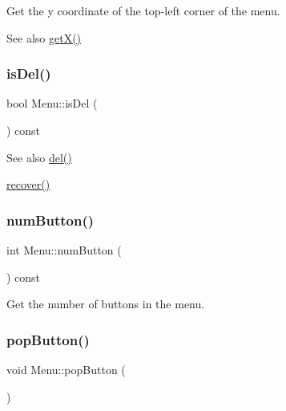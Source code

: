 Get the y coordinate of the top-\/left corner of the menu. 

\begin{DoxySeeAlso}{See also}
\mbox{\hyperlink{class_menu_a75345bb25315b3cbcc98ad276e043f4d}{get\+X()}} 
\end{DoxySeeAlso}
\mbox{\label{class_menu_a8dd5bf7c984e940e18688fc2d21a7697}} 
\subsubsection{\texorpdfstring{is\+Del()}{isDel()}}
{\footnotesize\ttfamily bool Menu\+::is\+Del (\begin{DoxyParamCaption}{ }\end{DoxyParamCaption}) const\hspace{0.3cm}{\ttfamily [inline]}}

\begin{DoxySeeAlso}{See also}
\mbox{\hyperlink{class_menu_a51548806948f9617dc6b66080eec0ca5}{del()}} 

\mbox{\hyperlink{class_menu_a75a1e9e303a0d8398b6cfc498a92ed48}{recover()}} 
\end{DoxySeeAlso}
\mbox{\label{class_menu_aa0878bc89af6cb4b96132966af62b1e0}} 
\subsubsection{\texorpdfstring{num\+Button()}{numButton()}}
{\footnotesize\ttfamily int Menu\+::num\+Button (\begin{DoxyParamCaption}{ }\end{DoxyParamCaption}) const\hspace{0.3cm}{\ttfamily [inline]}}



Get the number of buttons in the menu. 

\mbox{\label{class_menu_a674cd38ddc325b22ec9364e7f83f0b6d}} 
\subsubsection{\texorpdfstring{pop\+Button()}{popButton()}}
{\footnotesize\ttfamily void Menu\+::pop\+Button (\begin{DoxyParamCaption}{ }\end{DoxyParamCaption})\hspace{0.3cm}{\ttfamily [inline]}}



